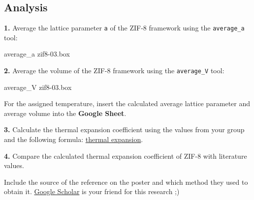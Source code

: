 \documentclass[
  letterpaper,
]{article}
\newenvironment{Shaded}{\begin{snugshade}}{\end{snugshade}}
\newcommand{\ExtensionTok}[1]{\textcolor[rgb]{0.00,0.23,0.31}{#1}}
\newcommand{\NormalTok}[1]{\textcolor[rgb]{0.00,0.23,0.31}{#1}}
\begin{document}
\hypertarget{analysis}{%
\subsection*{Analysis}\label{analysis}}


\textbf{1.} Average the lattice parameter \texttt{a} of the ZIF-8
framework using the \texttt{average\_a} tool:

\begin{Shaded}
\begin{Highlighting}[]
\ExtensionTok{average\_a}\NormalTok{ zif8{-}03.box}
\end{Highlighting}
\end{Shaded}

\textbf{2.} Average the volume of the ZIF-8 framework using the
\texttt{average\_V} tool:

\begin{Shaded}
\begin{Highlighting}[]
\ExtensionTok{average\_V}\NormalTok{ zif8{-}03.box}
\end{Highlighting}
\end{Shaded}

\begin{tcolorbox}[enhanced jigsaw, toptitle=1mm, opacitybacktitle=0.6, colframe=quarto-callout-important-color-frame, toprule=.15mm, breakable, bottomrule=.15mm, left=2mm, title=\textcolor{quarto-callout-important-color}{\faExclamation}\hspace{0.5em}{Important}, titlerule=0mm, leftrule=.75mm, bottomtitle=1mm, coltitle=black, arc=.35mm, rightrule=.15mm, opacityback=0, colback=white, colbacktitle=quarto-callout-important-color!10!white]

For the assigned temperature, insert the calculated average lattice
parameter and average volume into the \textbf{Google Sheet}.

\end{tcolorbox}

\textbf{3.} Calculate the thermal expansion coefficient using the values
from your group and the following formula:
\protect\hyperlink{linear--volumetric-thermal-expansion-coefficient}{thermal
expansion}.

\textbf{4.} Compare the calculated thermal expansion coefficient of
ZIF-8 with literature values.

\begin{tcolorbox}[enhanced jigsaw, toptitle=1mm, opacitybacktitle=0.6, colframe=quarto-callout-note-color-frame, toprule=.15mm, breakable, bottomrule=.15mm, left=2mm, title=\textcolor{quarto-callout-note-color}{\faInfo}\hspace{0.5em}{Note}, titlerule=0mm, leftrule=.75mm, bottomtitle=1mm, coltitle=black, arc=.35mm, rightrule=.15mm, opacityback=0, colback=white, colbacktitle=quarto-callout-note-color!10!white]

Include the source of the reference on the poster and which method they
used to obtain it. \href{https://scholar.google.com/}{Google Scholar} is
your friend for this research ;)

\end{tcolorbox}
\end{document}
